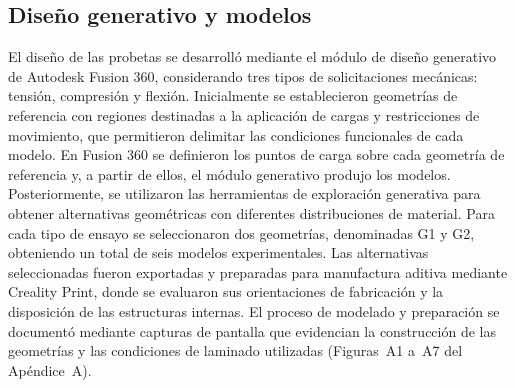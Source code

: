 \documentclass[10pt,twocolumn]{article}
\begin{document}
\subsection{Diseño generativo y modelos}
El diseño de las probetas se desarrolló mediante el módulo de diseño generativo de Autodesk Fusion 360, considerando tres tipos de solicitaciones mecánicas: tensión, compresión y flexión. Inicialmente se establecieron geometrías de referencia con regiones destinadas a la aplicación de cargas y restricciones de movimiento, que permitieron delimitar las condiciones funcionales de cada modelo. En Fusion 360 se definieron los puntos de carga sobre cada geometría de referencia y, a partir de ellos, el módulo generativo produjo los modelos. Posteriormente, se utilizaron las herramientas de exploración generativa para obtener alternativas geométricas con diferentes distribuciones de material. Para cada tipo de ensayo se seleccionaron dos geometrías, denominadas G1 y G2, obteniendo un total de seis modelos experimentales. Las alternativas seleccionadas fueron exportadas y preparadas para manufactura aditiva mediante Creality Print, donde se evaluaron sus orientaciones de fabricación y la disposición de las estructuras internas. El proceso de modelado y preparación se documentó mediante capturas de pantalla que evidencian la construcción de las geometrías y las condiciones de laminado utilizadas (Figuras~A1 a~A7 del Apéndice~A).
\end{document}
